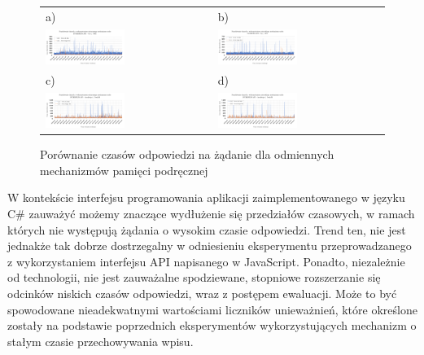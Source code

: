 \begin{figure}[htb]
  \centering
    \begin{tabular}{@{}ll@{}}
    a) & b) \\
    \includegraphics[width=0.49\textwidth]{rys05/dotnet-static-cache-chart.svg} & \includegraphics[width=0.49\textwidth]{rys05/dotnet-freq-cache-chart.pdf} \\
    c) & d) \\
    \includegraphics[width=0.49\textwidth]{rys05/nodejs-static-cache.pdf} & \includegraphics[width=0.49\textwidth]{rys05/nodejs-freq-cache.pdf}
    \end{tabular}
  \caption{Porównanie czasów odpowiedzi na żądanie dla odmiennych mechanizmów pamięci podręcznej}
  \label{fig:cache-charts}
\end{figure}

W kontekście interfejsu programowania aplikacji zaimplementowanego w języku C\# zauważyć możemy znaczące wydłużenie się przedziałów czasowych, w ramach których nie występują żądania o wysokim czasie odpowiedzi. Trend ten, nie jest jednakże tak dobrze dostrzegalny w odniesieniu eksperymentu przeprowadzanego z wykorzystaniem interfejsu API napisanego w JavaScript. Ponadto, niezależnie od technologii, nie jest zauważalne spodziewane, stopniowe rozszerzanie się odcinków niskich czasów odpowiedzi, wraz z postępem ewaluacji. Może to być spowodowane nieadekwatnymi wartościami liczników unieważnień, które określone zostały na podstawie poprzednich eksperymentów wykorzystujących mechanizm o stałym czasie przechowywania wpisu.
